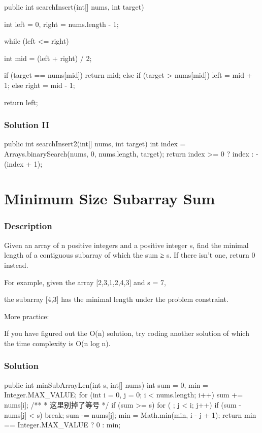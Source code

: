\begin{Code}
public int searchInsert(int[] nums, int target) {
    int left = 0, right = nums.length - 1;

    while (left <= right) {
        int mid = (left + right) / 2;

        if (target == nums[mid]) {
            return mid;
        } else if (target > nums[mid]) {
            left = mid + 1;
        } else {
            right = mid - 1;
        }
    }

    return left;
}
\end{Code}

\subsubsection{Solution II}
\begin{Code}
public int searchInsert2(int[] nums, int target) {
    int index = Arrays.binarySearch(nums, 0, nums.length, target);
    return index >= 0 ? index : -(index + 1);
}
\end{Code}

\newpage

\section{Minimum Size Subarray Sum} %

\subsubsection{Description}
Given an array of n positive integers and a positive integer s, find the minimal length of a contiguous subarray of which the sum ≥ s. If there isn't one, return 0 instead.

For example, given the array [2,3,1,2,4,3] and s = 7,

the subarray [4,3] has the minimal length under the problem constraint.

More practice:

If you have figured out the O(n) solution, try coding another solution of which the time complexity is O(n log n).
\subsubsection{Solution}

\begin{Code}
public int minSubArrayLen(int s, int[] nums) {
    int sum = 0, min = Integer.MAX_VALUE;
    for (int i = 0, j = 0; i < nums.length; i++) {
        sum += nums[i];
        /**
         * 这里别掉了等号
         */
        if (sum >= s) {
            for ( ; j < i; j++) {
                if (sum - nums[j] < s) {
                    break;
                }
                sum -= nums[j];
            }
            min = Math.min(min, i - j + 1);
        }
    }
    return min == Integer.MAX_VALUE ? 0 : min;
}
\end{Code}

